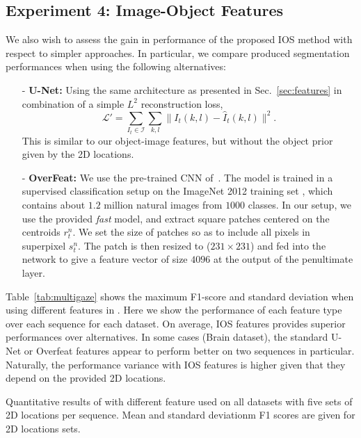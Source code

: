 {\subsection{Experiment 4: Image-Object Features}
We also wish to assess the gain in performance of the proposed IOS method with respect to simpler approaches. In particular, we compare produced segmentation performances when using the following alternatives:
\begin{itemize}
\item[-]{\bf{U-Net:}} Using the same architecture as presented in Sec.~\ref{sec:features} in combination of a simple $L^2$ reconstruction loss,
    \begin{equation}
    \mathcal{L}' = \sum_{{I}_t \in \mathcal{I}} \sum_{k,l} \| I_t(k,l) - {\hat{I}}_t(k,l)\|^2.
    \label{eq:loss_features}
    \end{equation}
    \noindent
    This is similar to our object-image features, but without the object prior given by the 2D locations.
  \item[-]{\bf{OverFeat:}} We use the pre-trained CNN of~\cite{sermanet13}. The model is trained in a supervised classification setup on the ImageNet 2012 training set \cite{deng09}, which contains about $1.2$ million natural images from $1000$ classes. In our setup, we use the provided \textit{fast} model, and extract square patches centered on the centroids $r_t^n$. We set the size of patches so as to include all pixels in superpixel $s_t^n$. The patch is then resized to ($231 \times 231$) and fed into the network to give a feature vector of size $4096$ at the output of the penultimate layer.
\end{itemize}

Table~\ref{tab:multigaze} shows the maximum F1-score and standard deviation when using different features in \KSP . Here we show the performance of each feature type over each sequence for each dataset. On average, IOS features provides superior performances over alternatives. In some cases (\eg Brain dataset), the standard U-Net or Overfeat features appear to perform better on two sequences in particular. Naturally, the performance variance with IOS features is higher given that they depend on the provided 2D locations. 

\begin{table}
\centering
\losscomp
\caption{Quantitative results of \KSPnb with different feature used on all datasets with five sets of 2D locations per sequence. Mean and standard deviationm F1 scores are given for 2D locations sets.}\label{tab:multigaze}
\end{table}

}
